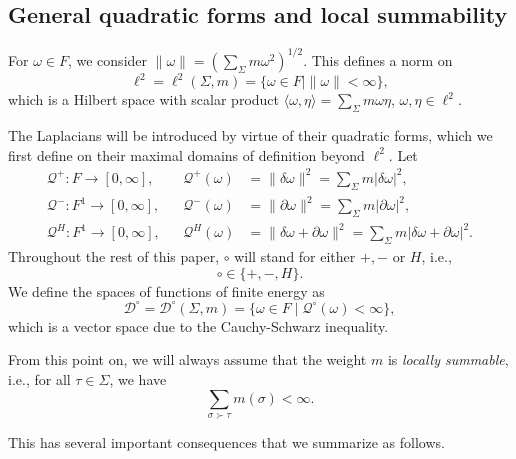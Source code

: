 \documentclass[10pt]{amsart}
\theoremstyle{definition}
\newcommand{\F}{{F}}
\renewcommand{\bullet}{{\circ}}
\newcommand{\Q}{\mathcal{Q}}
\begin{document}
\subsection{General quadratic forms and local summability}\label{summable}
For $\omega\in \F$, we consider
$\|\omega\|=\left(\sum_{\Sigma}m\omega^{2}\right)^{1/2}.$
This defines a norm on   $$\ell^{2}=\ell^2(\Sigma,m) = \lbrace\omega\in \F\mid \|\omega\|<\infty\rbrace,$$
which is a Hilbert space with scalar product $\langle\omega,\eta\rangle = \sum_{\Sigma}m\omega\eta$, $\omega,\eta\in \ell^{2}$.

 
The Laplacians will be introduced by virtue of their quadratic forms, which we first define on their maximal domains of definition beyond $\ell^{2}$.
Let
\begin{align*}
  \Q^+:\F\rightarrow[0,\infty],&&  \Q^+(\omega) &=\|\delta\omega\|^{2}= \sum_{\Sigma}m\vert\delta\omega\vert^2,\\
  \Q^-:\F^{1}\rightarrow[0,\infty],&&  \Q^-(\omega) &=\|\partial\omega\|^{2}= \sum_{\Sigma}m\vert\partial\omega\vert^2,\\
 \Q^H:\F^{1}\rightarrow[0,\infty],&&   \Q^H(\omega) &=\|\delta\omega+\partial\omega\|^{2}= \sum_{\Sigma}m\vert\delta\omega+\partial\omega\vert^2.
\end{align*}
Throughout the rest of this paper, $\bullet$  will stand for either $+,-$ or $H$, i.e.,
\begin{equation*}
	\bullet\in \{+,-,H\}.
\end{equation*} We define the spaces of functions of finite energy as $$\mathcal{D}^\bullet =\mathcal{D}^\bullet (\Sigma,m)= \lbrace \omega\in \F\mid\Q^\bullet(\omega)<\infty\rbrace,$$
which is a vector space due to the Cauchy-Schwarz inequality.


From this point on, we will always assume that the weight $m$ is \textit{locally summable}, i.e., for all $\tau\in\Sigma$, we have
$$\sum_{\sigma\succ\tau}m(\sigma)<\infty.$$ 


This has several important consequences that we summarize as follows.
\end{document}
